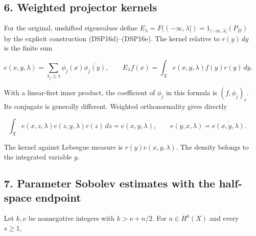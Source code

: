 \documentclass[
  11pt,
]{article}
\makeatletter
\let\ReaderOriginalAnchorStart\hyper@anchorstart
\let\ReaderOriginalAnchorEnd\hyper@anchorend
\let\ReaderPendingAliases\@empty
\def\ReaderArmAliases#1{\gdef\ReaderPendingAliases{#1}}
\def\hyper@anchorstart#1{\ReaderIfNativeAnchorTF{#1}{\ReaderPendingAliases\global\let\ReaderPendingAliases\@empty}{}\ReaderOriginalAnchorStart{#1}}
\makeatother
\begin{document}
\subsection{6. Weighted projector
kernels}\label{weighted-projector-kernels}

For the original, unshifted eigenvalues define
\(E_\lambda=F((-\infty,\lambda])=1_{(-\infty,\lambda]}(P_D)\) by the
explicit construction (DSP16d)--(DSP16e). The kernel relative to
\(r(y)\,dy\) is the finite sum

\[
 e(x,y,\lambda)=\sum_{\lambda_j\leq\lambda}\phi_j(x)\overline{\phi_j(y)},\qquad
 E_\lambda f(x)=\int_X e(x,y,\lambda)f(y)r(y)\,dy.
 \tag{DSP17}
\]

With a linear-first inner product, the coefficient of \(\phi_j\) in this
formula is \((f,\phi_j)_r\). Its conjugate is generally different.
Weighted orthonormality gives directly

\[
 \int_X e(x,z,\lambda)e(z,y,\lambda)r(z)\,dz=e(x,y,\lambda),\qquad
 e(y,x,\lambda)=\overline{e(x,y,\lambda)}.
 \tag{DSP18}
\]

The kernel against Lebesgue measure is \(r(y)e(x,y,\lambda)\). The
density belongs to the integrated variable \(y\).

\ReaderArmAliases{\ReaderOriginalAnchorStart{AN03-DSP-007}\ReaderOriginalAnchorEnd\begingroup\expandafter\def\csname @currentHref\endcsname{AN03-DSP-007}\label{AN03-DSP-007}\endgroup\ReaderOriginalAnchorStart{an03-dsp-007-parameter-sobolev-estimates-with-the-half-space-endpoint}\ReaderOriginalAnchorEnd\begingroup\expandafter\def\csname @currentHref\endcsname{an03-dsp-007-parameter-sobolev-estimates-with-the-half-space-endpoint}\label{an03-dsp-007-parameter-sobolev-estimates-with-the-half-space-endpoint}\endgroup\ReaderOriginalAnchorStart{7-parameter-sobolev-estimates-with-the-half-space-endpoint}\ReaderOriginalAnchorEnd\begingroup\expandafter\def\csname @currentHref\endcsname{7-parameter-sobolev-estimates-with-the-half-space-endpoint}\label{7-parameter-sobolev-estimates-with-the-half-space-endpoint}\endgroup\ReaderOriginalAnchorStart{parameter-sobolev-estimates-with-the-half-space-endpoint}\ReaderOriginalAnchorEnd}
\subsection{7. Parameter Sobolev estimates with the half-space
endpoint}\label{parameter-sobolev-estimates-with-the-half-space-endpoint}

Let \(k,\nu\) be nonnegative integers with \(k>\nu+n/2\). For
\(u\in H^k(X)\) and every \(s\geq1\),
\end{document}
